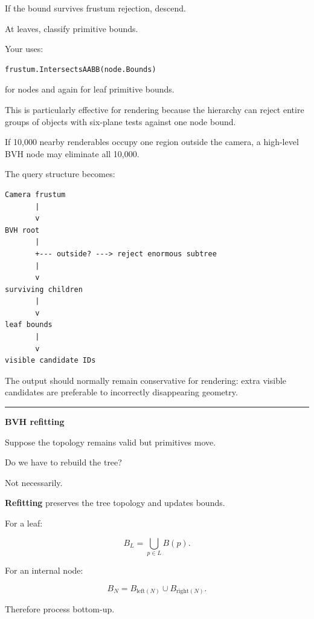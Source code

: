 If the bound survives frustum rejection, descend.

At leaves, classify primitive bounds.

Your  uses:

\begin{verbatim}
frustum.IntersectsAABB(node.Bounds)
\end{verbatim}

for nodes and again for leaf primitive bounds.

This is particularly effective for rendering because the hierarchy can reject entire groups of objects with six-plane tests against one node bound.

If 10,000 nearby renderables occupy one region outside the camera, a high-level BVH node may eliminate all 10,000.

The query structure becomes:

\begin{verbatim}
Camera frustum
       |
       v
BVH root
       |
       +--- outside? ---> reject enormous subtree
       |
       v
surviving children
       |
       v
leaf bounds
       |
       v
visible candidate IDs
\end{verbatim}

The output should normally remain conservative for rendering: extra visible candidates are preferable to incorrectly disappearing geometry.

\begin{center}\rule{0.5\linewidth}{0.5pt}\end{center}

\textbf{BVH refitting}

Suppose the topology remains valid but primitives move.

Do we have to rebuild the tree?

Not necessarily.

\textbf{Refitting} preserves the tree topology and updates bounds.

For a leaf:

\[
B_L
=
\bigcup_{p\in L}
B(p).
\]

For an internal node:

\[
B_N=
B_{\text{left}(N)}
\cup
B_{\text{right}(N)}.
\]

Therefore process bottom-up.

